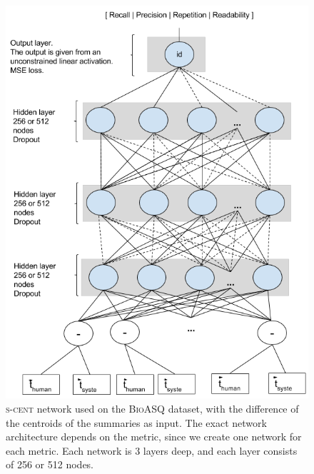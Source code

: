 \documentclass[11pt,a4paper]{article}
\newcommand{\bioasq}{\textsc{BioASQ}\xspace}
\begin{document}
\begin{figure}[ht]
{
\centering
\includegraphics[scale=0.35]{../../my_diagrams/BioASQ_networks/BioASQ_s-cent.png}
\caption{\textsc{s-cent} network used on the \bioasq dataset, with the difference of the centroids of the summaries as input. The exact network architecture depends on the metric, since we create one network for each metric. Each network is 3 layers deep, and each layer consists of 256 or 512 nodes.}
\label{fig:bioasq-s-cent}
}
\end{figure}
\end{document}
